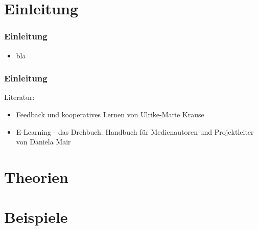 
%
%

\section{Einleitung}

\begin{frame}[<+->]
    \frametitle{Einleitung}
    \begin{itemize}
        \item bla
    \end{itemize}
\end{frame}

\begin{frame}
    \frametitle{Einleitung}
    
    Literatur:
    \begin{itemize}
        \item Feedback und kooperatives Lernen von Ulrike-Marie Krause
        \item E-Learning - das Drehbuch. Handbuch für Medienautoren und Projektleiter von Daniela Mair
    \end{itemize}
\end{frame}

\section{Theorien}

\section{Beispiele}

